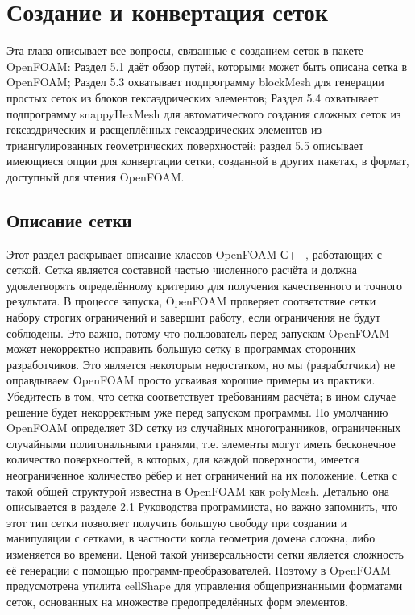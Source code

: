 \chapter{Создание и конвертация сеток}

Эта глава описывает все вопросы, связанные с созданием сеток в пакете OpenFOAM:
Раздел 5.1 даёт обзор путей, которыми может быть описана сетка в OpenFOAM;
 Раздел 5.3 охватывает подпрограмму blockMesh для генерации простых сеток из
блоков
гексаэдрических элементов; Раздел 5.4 охватывает подпрограмму snappyHexMesh для
автоматического создания сложных сеток из гексаэдрических и расщеплённых
гексаэдрических элементов из
 триангулированных геометрических поверхностей; раздел
5.5 описывает имеющиеся опции для конвертации сетки, созданной в других пакетах,
в формат, доступный для чтения OpenFOAM.

\section{Описание сетки}
\label{sec:5.1}

Этот раздел раскрывает описание классов OpenFOAM С++, работающих с сеткой.
Сетка является составной частью численного расчёта и должна удовлетворять
определённому
 критерию для получения качественного и точного результата. В процессе
запуска, OpenFOAM проверяет соответствие сетки набору строгих ограничений и
завершит
 работу, если ограничения не будут соблюдены. Это важно, потому что пользователь
 перед запуском OpenFOAM может некорректно исправить большую сетку
в программах сторонних разработчиков. Это является некоторым недостатком, но
мы (разработчики) не оправдываем OpenFOAM просто усваивая хорошие примеры
из практики. Убедитесть в том, что сетка соответствует требованиям расчёта; в
ином
случае решение будет некорректным уже перед запуском программы.
По умолчанию OpenFOAM определяет 3D сетку из случайных многогранников,
ограниченных случайными полигональными гранями, т.е. элементы могут иметь
бесконечное количество поверхностей, в которых, для каждой поверхности, имеется
 неограниченное количество рёбер и нет ограничений на их положение. Сетка с
такой
 общей структурой известна в OpenFOAM как polyMesh. Детально она
описывается в разделе 2.1 Руководства программиста, но важно запомнить, что
этот тип сетки позволяет получить большую свободу при создании и манипуляции
с сетками, в частности когда геометрия домена сложна, либо изменяется во времени.
 Ценой такой универсальности сетки является сложность её генерации с помощью
 программ-преобразователей. Поэтому в OpenFOAM предусмотрена утилита
cellShape для управления общепризнанными форматами сеток, основанных на множестве
 предопределённых форм элементов.

